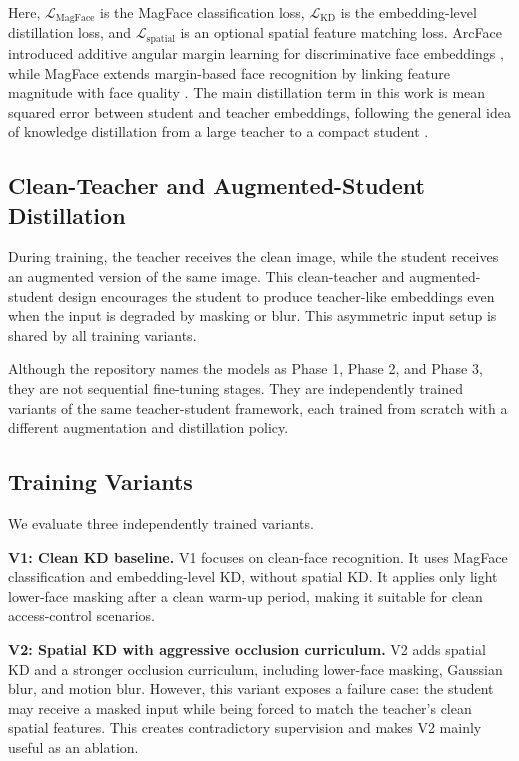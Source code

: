 Here, $\mathcal{L}_{\mathrm{MagFace}}$ is the MagFace classification loss, $\mathcal{L}_{\mathrm{KD}}$ is the embedding-level distillation loss, and $\mathcal{L}_{\mathrm{spatial}}$ is an optional spatial feature matching loss. ArcFace introduced additive angular margin learning for discriminative face embeddings \cite{arcface}, while MagFace extends margin-based face recognition by linking feature magnitude with face quality \cite{magface}. The main distillation term in this work is mean squared error between student and teacher embeddings, following the general idea of knowledge distillation from a large teacher to a compact student \cite{hinton2015distilling}\cite{relationalkd}.

\subsection{Clean-Teacher and Augmented-Student Distillation}

During training, the teacher receives the clean image, while the student receives an augmented version of the same image. This clean-teacher and augmented-student design encourages the student to produce teacher-like embeddings even when the input is degraded by masking or blur. This asymmetric input setup is shared by all training variants.

Although the repository names the models as Phase 1, Phase 2, and Phase 3, they are not sequential fine-tuning stages. They are independently trained variants of the same teacher-student framework, each trained from scratch with a different augmentation and distillation policy.

\subsection{Training Variants}

We evaluate three independently trained variants.

\textbf{V1: Clean KD baseline.}
V1 focuses on clean-face recognition. It uses MagFace classification and embedding-level KD, without spatial KD. It applies only light lower-face masking after a clean warm-up period, making it suitable for clean access-control scenarios.

\textbf{V2: Spatial KD with aggressive occlusion curriculum.}
V2 adds spatial KD and a stronger occlusion curriculum, including lower-face masking, Gaussian blur, and motion blur. However, this variant exposes a failure case: the student may receive a masked input while being forced to match the teacher's clean spatial features. This creates contradictory supervision and makes V2 mainly useful as an ablation.

